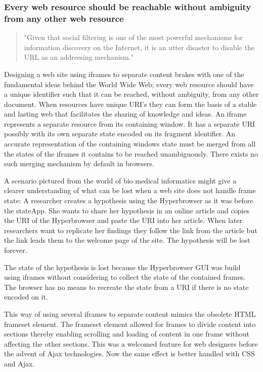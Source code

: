 \documentclass[english]{ifimaster}
\begin{document}
\subsubsection{Every web resource should be reachable without ambiguity from any other web resource}
\begin{quotation}
\noindent "Given that social filtering is one of the most powerful mechanisms for information discovery on the Internet, it is an utter disaster to disable the URL as an addressing mechanism."\parencite{nielsenFrames}
\end{quotation}
Designing a web site using iframes to separate content brakes with one of the fundamental ideas behind the World Wide Web; every web resource should have a unique identifier such that it can be reached, without ambiguity, from any other document\parencite{wwwArchitectureW3C}. When resources have unique URI's they can form the basis of a stable and lasting web that facilitates the sharing of knowledge and ideas. An iframe represents a separate resource from its containing window. It has a separate URI possibly with its own separate state encoded on its fragment identifier. An accurate representation of the containing windows state must be merged from all the states of the iframes it contains to be reached unambiguously. There exists no such merging mechanism by default in browsers. 

A scenario pictured from the world of bio medical informatics might give a clearer understanding of what can be lost when a web site does not handle frame state: A researcher creates a hypothesis using the Hyperbrowser as it was before the stateApp. She wants to share her hypothesis in an online article and copies the URI of the Hyperbrowser and paste the URI into her article. When later researchers want to replicate her findings they follow the link from the article but the link leads them to the welcome page of the site. The hypothesis will be lost forever.

The state of the hypothesis is lost because the Hyperbrowser GUI was build using iframes without considering to collect the state of the contained frames. The browser has no means to recreate the state from a URI if there is no state encoded on it. 

This way of using several iframes to separate content mimics the obsolete HTML frameset element. The frameset element allowed for frames to divide content into sections thereby enabling scrolling and loading of content in one frame without affecting the other sections. This was a welcomed feature for web designers before the advent of Ajax technologies. Now the same effect is better handled with CSS and Ajax. 
\end{document}
